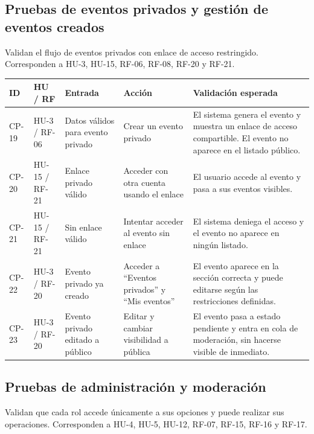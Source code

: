 \subsection{Pruebas de eventos privados y gestión de eventos creados}

Validan el flujo de eventos privados con enlace de acceso restringido. Corresponden a HU-3, HU-15, RF-06, RF-08, RF-20 y RF-21.

\begin{longtable}{|p{1.3cm}|p{1.6cm}|p{3cm}|p{3.8cm}|p{4.3cm}|}
\hline
\textbf{ID} & \textbf{HU / RF} & \textbf{Entrada} & \textbf{Acción} & \textbf{Validación esperada} \\
\hline
{}\label{cp:19}CP-19 & HU-3 / RF-06 & Datos válidos para evento privado & Crear un evento privado & El sistema genera el evento y muestra un enlace de acceso compartible. El evento no aparece en el listado público. \\
\hline
{}\label{cp:20}CP-20 & HU-15 / RF-21 & Enlace privado válido & Acceder con otra cuenta usando el enlace & El usuario accede al evento y pasa a sus eventos visibles. \\
\hline
{}\label{cp:21}CP-21 & HU-15 / RF-21 & Sin enlace válido & Intentar acceder al evento sin enlace & El sistema deniega el acceso y el evento no aparece en ningún listado. \\
\hline
{}\label{cp:22}CP-22 & HU-3 / RF-20 & Evento privado ya creado & Acceder a ``Eventos privados'' y ``Mis eventos'' & El evento aparece en la sección correcta y puede editarse según las restricciones definidas. \\
\hline
{}\label{cp:23}CP-23 & HU-3 / RF-20 & Evento privado editado a público & Editar y cambiar visibilidad a pública & El evento pasa a estado pendiente y entra en cola de moderación, sin hacerse visible de inmediato. \\
\hline
\end{longtable}

\subsection{Pruebas de administración y moderación}

Validan que cada rol accede únicamente a sus opciones y puede realizar sus operaciones. Corresponden a HU-4, HU-5, HU-12, RF-07, RF-15, RF-16 y RF-17.

